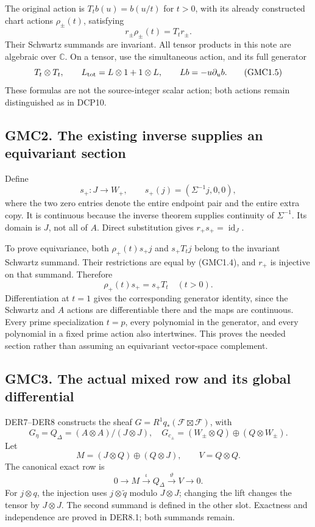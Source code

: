 The original action is \(T_t b(u)=b(u/t)\) for \(t>0\), with its already
constructed chart actions \(\rho_\pm(t)\), satisfying \[
r_\pm\rho_\pm(t)=T_t r_\pm.
\tag{GMC1.4}
\] Their Schwartz summands are invariant. All tensor products in this
note are algebraic over \(\mathbb C\). On a tensor, use the simultaneous
action, and its full generator \[
T_t\otimes T_t,\qquad L_{\rm tot}=L\otimes1+1\otimes L,
\qquad Lb=-u\partial_u b.
\tag{GMC1.5}
\] These formulas are not the source-integer scalar action; both actions
remain distinguished as in DCP10.

\subsection{GMC2. The existing inverse supplies an equivariant
section}\label{gmc2.-the-existing-inverse-supplies-an-equivariant-section}

Define \[
s_+:J\longrightarrow W_+,
\qquad s_+(j)=(\Sigma^{-1}j,0,0),
\tag{GMC2.1}
\] where the two zero entries denote the entire endpoint pair and the
entire extra copy. It is continuous because the inverse theorem supplies
continuity of \(\Sigma^{-1}\). Its domain is \(J\), not all of \(A\).
Direct substitution gives \(r_+s_+=\operatorname{id}_J\).

To prove equivariance, both \(\rho_+(t)s_+j\) and \(s_+T_tj\) belong to
the invariant Schwartz summand. Their restrictions are equal by
(GMC1.4), and \(r_+\) is injective on that summand. Therefore \[
\rho_+(t)s_+=s_+T_t\quad(t>0).
\tag{GMC2.2}
\] Differentiation at \(t=1\) gives the corresponding generator
identity, since the Schwartz and \(A\) actions are differentiable there
and the maps are continuous. Every prime specialization \(t=p\), every
polynomial in the generator, and every polynomial in a fixed prime
action also intertwines. This proves the needed section rather than
assuming an equivariant vector-space complement.

\subsection{GMC3. The actual mixed row and its global
differential}\label{gmc3.-the-actual-mixed-row-and-its-global-differential}

DER7--DER8 constructs the sheaf
\(G=R^1q_*(\mathcal F\boxtimes\mathcal F)\), with \[
G_\eta=Q_\Delta=(A\otimes A)/(J\otimes J),
\quad G_{c_\pm}=(W_\pm\otimes Q)\oplus(Q\otimes W_\pm).
\tag{GMC3.1}
\] Let \[
M=(J\otimes Q)\oplus(Q\otimes J),\qquad V=Q\otimes Q.
\] The canonical exact row is \[
0\longrightarrow M\xrightarrow{\iota}Q_\Delta
\xrightarrow{\vartheta}V\longrightarrow0.
\tag{GMC3.2}
\] For \(j\otimes q\), the injection uses \(j\otimes\widetilde q\)
modulo \(J\otimes J\); changing the lift changes the tensor by
\(J\otimes J\). The second summand is defined in the other slot.
Exactness and independence are proved in DER8.1; both summands remain.

